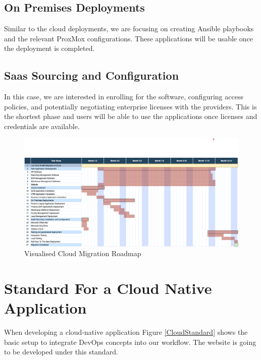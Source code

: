 \documentclass{llncs}
\begin{document}
\subsection{On Premises Deployments}

Similar to the cloud deployments, we are focusing on creating Ansible playbooks and the relevant ProxMox configurations. These applications will be usable once the deployment is completed.

\subsection{Saas Sourcing and Configuration}

In this case, we are interested in enrolling for the software, configuring access policies, and potentially negotiating enterprise licenses with the providers. This is the shortest phase and users will be able to use the applications once licenses and credentials are available.
\newpage
\begin{figure}[htbp]
    \begin{center}
        \includegraphics[width=1\textwidth]{diagrams/roadmap.png}
        \vspace{0.01\textwidth}
        \caption{Visualised Cloud Migration Roadmap}
        \label{cloud migration roadmap} %
    \end{center}
\end{figure}


\section{Standard For a Cloud Native Application}

When developing a cloud-native application Figure \ref{CloudStandard} shows the basic setup to integrate DevOps concepts into our workflow.
The website is going to be developed under this standard.\\
\end{document}
